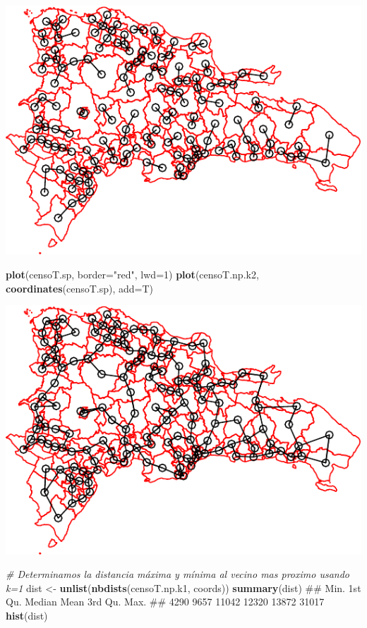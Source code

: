 \documentclass[11pt,]{article}
\newenvironment{Shaded}{\begin{snugshade}}{\end{snugshade}}
\newcommand{\KeywordTok}[1]{\textcolor[rgb]{0.13,0.29,0.53}{\textbf{#1}}}
\newcommand{\DataTypeTok}[1]{\textcolor[rgb]{0.13,0.29,0.53}{#1}}
\newcommand{\DecValTok}[1]{\textcolor[rgb]{0.00,0.00,0.81}{#1}}
\newcommand{\StringTok}[1]{\textcolor[rgb]{0.31,0.60,0.02}{#1}}
\newcommand{\CommentTok}[1]{\textcolor[rgb]{0.56,0.35,0.01}{\textit{#1}}}
\newcommand{\NormalTok}[1]{#1}
\begin{document}
\includegraphics[width=1\linewidth]{img/unnamed-chunk-4-2}

\begin{Shaded}
\begin{Highlighting}[]

\KeywordTok{plot}\NormalTok{(censoT.sp, }\DataTypeTok{border=}\StringTok{"red"}\NormalTok{, }\DataTypeTok{lwd=}\DecValTok{1}\NormalTok{)}
\KeywordTok{plot}\NormalTok{(censoT.np.k2, }\KeywordTok{coordinates}\NormalTok{(censoT.sp), }\DataTypeTok{add=}\NormalTok{T)}
\end{Highlighting}
\end{Shaded}

\includegraphics[width=1\linewidth]{img/unnamed-chunk-4-3}

\begin{Shaded}
\begin{Highlighting}[]

\CommentTok{# Determinamos la distancia máxima y mínima al vecino mas proximo usando k=1}
\NormalTok{dist <-}\StringTok{ }\KeywordTok{unlist}\NormalTok{(}\KeywordTok{nbdists}\NormalTok{(censoT.np.k1, coords))}
\KeywordTok{summary}\NormalTok{(dist)}
\NormalTok{##    Min. 1st Qu.  Median    Mean 3rd Qu.    Max. }
\NormalTok{##    4290    9657   11042   12320   13872   31017}
\KeywordTok{hist}\NormalTok{(dist)}
\end{Highlighting}
\end{Shaded}
\end{document}
